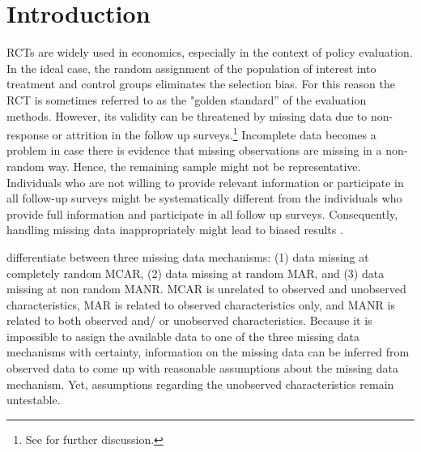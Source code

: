 
\section{Introduction}


\acp{RCT} are widely used in economics, especially in the context of policy evaluation. In the ideal case, the random assignment of the population of interest into treatment and control groups eliminates the selection bias. For this reason the \ac{RCT} is sometimes referred to as the "golden standard'' of the evaluation methods.
However, its validity can be threatened by missing data due to non-response or attrition in the follow up surveys.\footnote{See \cite{angristmostly2008} for further discussion.} Incomplete data becomes a problem in case there is evidence that missing observations are missing in a non-random way. Hence, the remaining sample might not be representative. Individuals who are not willing to provide relevant information or participate in all follow-up surveys might be systematically different from the individuals who provide full information and participate in all follow up surveys. Consequently, handling missing data inappropriately might lead to biased results \cite{heckman1976common, lee2009training, kling2007experimental}.

\cite{little1989analysis} differentiate between three missing data mechanisms: (1) data missing at completely random \ac{MCAR}, (2) data missing at random \ac{MAR}, and (3) data missing at non random \ac{MANR}. \ac{MCAR} is unrelated to observed and unobserved characteristics, \ac{MAR} is related to observed characteristics only, and \ac{MANR} is related to both observed and/ or unobserved characteristics. Because it is impossible to assign the available data to one of the three missing data mechanisms with certainty, information on the missing data can be inferred from observed data to come up with reasonable assumptions about the missing data mechanism. Yet, assumptions regarding the unobserved characteristics remain untestable.


